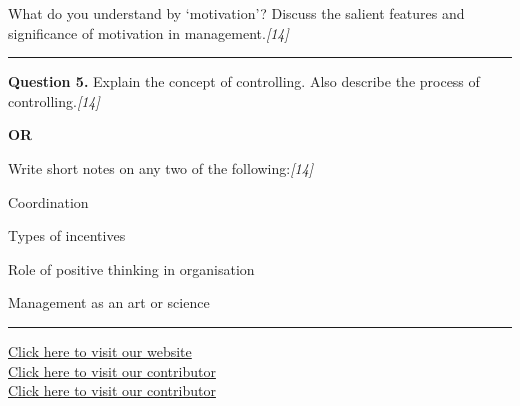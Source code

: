 \documentclass[11pt,a4paper]{article}
\newcommand{\pts}[1]{\hfill   \textit{[#1]}}
\begin{document}
What do you understand by `motivation'? Discuss the salient features and significance of motivation in management.\pts{14}

\medskip\rule{\linewidth}{0.2pt}




\noindent   \textbf{Question 5.}
Explain the concept of controlling. Also describe the process of controlling.\pts{14}

\centerline{   \textbf{OR}}

Write short notes on any two of the following:\pts{14}

\begin{parts}
  \item Coordination
  \item Types of incentives
  \item Role of positive thinking in organisation
  \item Management as an art or science
\end{parts}

\vfill
\rule{\linewidth}{0.4pt}

\begin{center}\small
\href{https://bhu-exam.vercel.app/}{Click here to visit our website}\\[4pt]
\href{https://me-aryan.vercel.app/}{Click here to visit our contributor}\\[4pt]
\href{https://quashan-me.vercel.app/}{Click here to visit our contributor}
\end{center}
\end{document}

